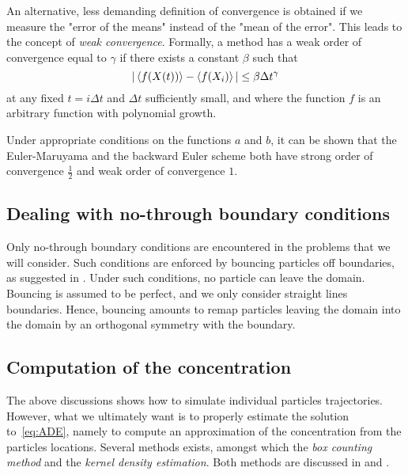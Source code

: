 An alternative, less demanding definition of convergence is obtained if we measure the "error of the means" instead of the "mean of the error". This leads to the concept of \textit{weak convergence}. Formally, a method has a weak order of convergence equal to $\gamma$ if there exists a constant $\beta$ such that
\begin{equation}
	|\left\langle f(X(t)) \right\rangle - \left\langle f(X_i) \right\rangle| \le \beta \Delta t^{\gamma}
\end{equation}
at any fixed $t = i\Delta t$ and $\Delta t$ sufficiently small, and where the function $f$ is an arbitrary function with polynomial growth.

Under appropriate conditions on the functions $a$ and $b$, it can be shown that the Euler-Maruyama and the backward Euler scheme both have strong order of convergence $\frac{1}{2}$ and weak order of convergence $1$.

\subsection{Dealing with no-through boundary conditions}
Only no-through boundary conditions are encountered in the problems that we will consider. Such conditions are enforced by bouncing particles off boundaries, as suggested in \cite{tompson1992particle}. Under such conditions, no particle can leave the domain. Bouncing is assumed to be perfect, and we only consider straight lines boundaries. Hence, bouncing amounts to remap particles leaving the domain into the domain by an orthogonal symmetry with the boundary.

\subsection{Computation of the concentration} \label{boxcounting_kernel}
The above discussions shows how to simulate individual particles trajectories. However, what we ultimately want is to properly estimate the solution to~\eqref{eq:ADE}, namely to compute an approximation of the concentration from the particles locations. Several methods exists, amongst which the \textit{box counting method} and the \textit{kernel density estimation}. Both methods are discussed in \cite{spivakovskaya2007lagrangian} and \cite{dehaan1999densitykernel}.

